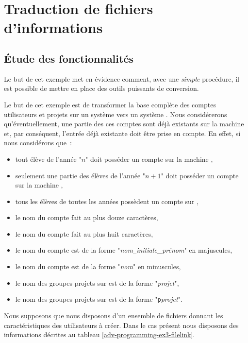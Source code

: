 \section{\label{adv-programming-ex3}Traduction de fichiers d'informations}

\subsection{\label{adv-programming-ex3-fcts}{\'E}tude des fonctionnalit{\'e}s}

Le but de cet exemple met en {\'e}vidence comment, avec une {\sl simple} proc{\'e}dure, il
est possible de mettre en place des outils puissants de conversion. 

Le but de cet exemple est de transformer la base compl{\`e}te des comptes utilisateurs
et projets sur un syst{\`e}me {\OpenVMS} vers un syst{\`e}me {\Unix}. Nous consid{\'e}rerons
qu'{\'e}ventuellement, une partie des ces comptes sont d{\'e}j{\`a} existants sur la machine
{\Unix} et, par cons{\'e}quent, l'entr{\'e}e d{\'e}j{\`a} existante doit {\^e}tre prise en
compte. En effet, si nous consid{\'e}rons que~:
\begin{itemize}
	\item	tout {\'e}l{\`e}ve de l'ann{\'e}e "$n$" doit poss{\'e}der un compte
			sur la machine {\Unix},
	\item	seulement une partie des {\'e}l{\`e}ves de l'ann{\'e}e "$n+1$" doit
			poss{\'e}der un compte sur la machine {\Unix},
	\item	tous les {\'e}l{\`e}ves de toutes les ann{\'e}es poss{\`e}dent un compte sur
			{\OpenVMS},
	\item	le nom du compte {\OpenVMS} fait au plus douze caract{\`e}res,
	\item	le nom du compte {\Unix} fait au plus huit caract{\`e}res,
	\item	le nom du compte {\OpenVMS} est de la forme
			"{\sl nom}{\tt \_}{\sl initiale\_pr{\'e}nom}" en majuscules,
	\item	le nom du compte {\Unix} est de la forme "{\sl nom}" en minuscules,
	\item	le nom des groupes projets sur {\OpenVMS} est de la forme
			"{\sl projet}",
	\item	le nom des groupes projets sur {\Unix} est de la forme
			"{\tt p}{\sl projet}".
\end{itemize}

Nous supposons que nous disposons d'un ensemble de fichiers donnant les
caract{\'e}ristiques des utilisateurs {\`a} cr{\'e}er. Dans le cas
pr{\'e}sent nous disposons des informations d{\'e}crites au tableau
\ref{adv-programming-ex3-filelink}.

